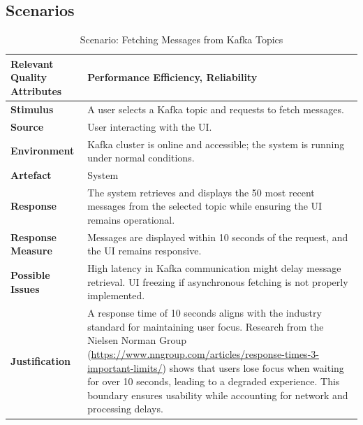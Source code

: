 \documentclass[10pt , a4paper]{report}
\begin{document}
\subsection{Scenarios}
\begin{small}
\begin{table}[h!tbp]
\centering
\renewcommand{\arraystretch}{1.3} %
\begin{tabular}{|l|p{9cm}|}
\hline
\textbf{Relevant Quality Attributes} & Performance Efficiency, Reliability \\ \hline
\textbf{Stimulus} & A user selects a Kafka topic and requests to fetch messages. \\ \hline
\textbf{Source} & User interacting with the UI. \\ \hline
\textbf{Environment} & Kafka cluster is online and accessible; the system is running under normal conditions. \\ \hline
\textbf{Artefact} & System \\ \hline
\textbf{Response} & The system retrieves and displays the 50 most recent messages from the selected topic while ensuring the UI remains operational. \\ \hline
\textbf{Response Measure} & Messages are displayed within 10 seconds of the request, and the UI remains responsive. \\ \hline
\textbf{Possible Issues} & High latency in Kafka communication might delay message retrieval. UI freezing if asynchronous fetching is not properly implemented. \\ \hline
\textbf{Justification} & A response time of 10 seconds aligns with the industry standard for maintaining user focus. Research from the Nielsen Norman Group (\url{https://www.nngroup.com/articles/response-times-3-important-limits/}) shows that users lose focus when waiting for over 10 seconds, leading to a degraded experience. This boundary ensures usability while accounting for network and processing delays. \\ \hline
\end{tabular}
\caption{Scenario: Fetching Messages from Kafka Topics}
\end{table}


\end{small}
\end{document}
